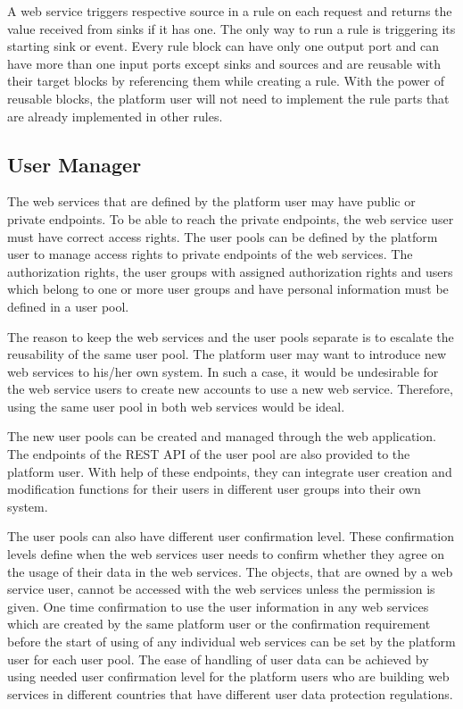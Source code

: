  A web service triggers respective source in a rule on each request and returns the value received from sinks if it has one. The only way to run a rule is triggering its starting sink or event. Every rule block can have only one output port and can have more than one input ports except sinks and sources and are reusable with their target blocks by referencing them while creating a rule. With the power of reusable blocks, the platform user will not need to implement the rule parts that are already implemented in other rules.

\subsection{User Manager}

The web services that are defined by the platform user may have public or private endpoints. To be able to reach the private endpoints, the web service user must have correct access rights. The user pools can be defined by the platform user to manage access rights to private endpoints of the web services. The authorization rights, the user groups with assigned authorization rights and users which belong to one or more user groups and have personal information must be defined in a user pool. 

The reason to keep the web services and the user pools separate is to escalate the reusability of the same user pool. The platform user may want to introduce new web services to his/her own system. In such a case, it would be undesirable for the web service users to create new accounts to use a new web service. Therefore, using the same user pool in both web services would be ideal. 

The new user pools can be created and managed through the web application. The endpoints of the REST API of the user pool are also provided to the platform user. With help of these endpoints, they can integrate user creation and modification functions for their users in different user groups into their own system. 

The user pools can also have different user confirmation level. These confirmation levels define when the web services user needs to confirm whether they agree on the usage of their data in the web services. The objects, that are owned by a web service user, cannot be accessed with the web services unless the permission is given. One time confirmation to use the user information in any web services which are created by the same platform user or the confirmation requirement before the start of using of any individual web services can be set by the platform user for each user pool. The ease of handling of user data can be achieved by using needed user confirmation level for the platform users who are building web services in different countries that have different user data protection regulations.


